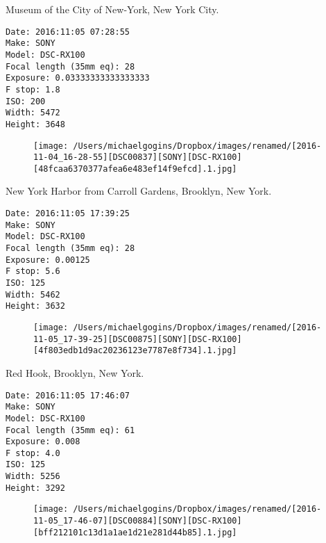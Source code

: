 \documentclass[11pt,letter,DIV=14,paper=landscape]{scrbook}
\begin{document}
\clearpage
\noindent Museum of the City of New-York, New York City.
\noindent
\begin{lstlisting}
Date: 2016:11:05 07:28:55
Make: SONY
Model: DSC-RX100
Focal length (35mm eq): 28
Exposure: 0.03333333333333333
F stop: 1.8
ISO: 200
Width: 5472
Height: 3648
\end{lstlisting}
\clearpage

\begin{figure}
\texttt{[image: /Users/michaelgogins/Dropbox/images/renamed/[2016-11-04\_16-28-55][DSC00837][SONY][DSC-RX100][48fcaa6370377afea6e483ef14f9efcd].1.jpg]}
\end{figure}
    
\clearpage
\noindent New York Harbor from Carroll Gardens, Brooklyn, New York.
\noindent
\begin{lstlisting}
Date: 2016:11:05 17:39:25
Make: SONY
Model: DSC-RX100
Focal length (35mm eq): 28
Exposure: 0.00125
F stop: 5.6
ISO: 125
Width: 5462
Height: 3632
\end{lstlisting}
\clearpage

\begin{figure}
\texttt{[image: /Users/michaelgogins/Dropbox/images/renamed/[2016-11-05\_17-39-25][DSC00875][SONY][DSC-RX100][4f803edb1d9ac20236123e7787e8f734].1.jpg]}
\end{figure}
    
\clearpage
\noindent Red Hook, Brooklyn, New York.
\noindent
\begin{lstlisting}
Date: 2016:11:05 17:46:07
Make: SONY
Model: DSC-RX100
Focal length (35mm eq): 61
Exposure: 0.008
F stop: 4.0
ISO: 125
Width: 5256
Height: 3292
\end{lstlisting}
\clearpage

\begin{figure}
\texttt{[image: /Users/michaelgogins/Dropbox/images/renamed/[2016-11-05\_17-46-07][DSC00884][SONY][DSC-RX100][bff212101c13d1a1ae1d21e281d44b85].1.jpg]}
\end{figure}
    
\end{document}
